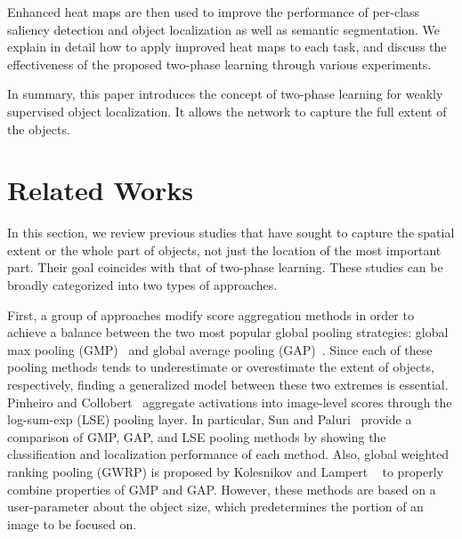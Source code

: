 \documentclass[10pt,twocolumn,letterpaper]{article}
\begin{document}
Enhanced heat maps are then used to improve the performance of per-class saliency detection and object localization as well as semantic segmentation. We explain in detail how to apply improved heat maps to each task, and discuss the effectiveness of the proposed two-phase learning through various experiments.

In summary, this paper introduces the concept of two-phase learning for weakly supervised object localization. It allows the network to capture the full extent of the objects.  

\section{Related Works}
\label{sec:related_work}
In this section, we review previous studies that have sought to capture the spatial extent or the whole part of objects, not just the location of the most important part. Their goal coincides with that of two-phase learning. These studies can be broadly categorized into two types of approaches.

First, a group of approaches modify score aggregation methods in order to achieve a balance between the two most popular global pooling strategies: global max pooling (GMP)~\cite{Oquab15} and global average pooling (GAP)~\cite{zhou2016cvpr}. Since each of these pooling methods tends to underestimate or overestimate the extent of objects, respectively, finding a generalized model between these two extremes is essential. 
Pinheiro and Collobert~\cite{Pinheiro2015CVPR} aggregate activations into image-level scores through the log-sum-exp (LSE) pooling layer. In particular, Sun and Paluri~\cite{SunPCNB16pro} provide a comparison of GMP, GAP, and LSE pooling methods by showing the classification and localization performance of each method. Also, global weighted ranking pooling (GWRP) is proposed by Kolesnikov and Lampert ~\cite{kolesnikov2016seed} to properly combine properties of GMP and GAP. However, these methods are based on a user-parameter about the object size, which predetermines the portion of an image to be focused on.
\end{document}

